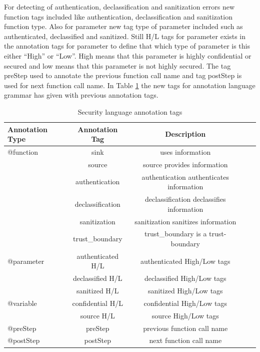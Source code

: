 For detecting of authentication, declassification and sanitization errors new function tags included like authentication, declassification and sanitization function type. Also for parameter new tag type of parameter included such as authenticated, declassified and sanitized. Still H/L tags for parameter exists in the annotation tags for parameter to define that which type of parameter is this either \enquote{High} or \enquote{Low}. High means that this parameter is highly confidential or secured and low means that this parameter is not highly secured. The tag preStep used to annotate the previous function call name and tag postStep is used for next function call name. In Table \ref{table:Security_language_annotation_tags} the new tags for annotation language grammar has given with previous annotation tags. 

\begin{table}
	\centering
\begin{tabular}{l*{3}{c}r}
	\hline
	Annotation Type   & Annotation Tag & Description  \\
	\hline

	@function         & sink  		   & uses information \\
	                  & source         & source provides information	\\
	                  & authentication & authentication authenticates information	\\
	                  & declassification& declassification declassifies information	\\
	                  & sanitization   & sanitization sanitizes information	\\
	                  & trust\_boundary& trust\_boundary is a trust-boundary\\ \hline

	@parameter        & authenticated H/L & authenticated High/Low tags    \\
					  & declassified H/L  & declassified High/Low tags    \\
				      & sanitized H/L     & sanitized High/Low tags    \\ \hline
	@variable         & confidential H/L & confidential High/Low tags\\
					  & source H/L & source High/Low tags   \\
	\hline
	
	@preStep         & preStep  & previous function call name\\ 	\hline
	@postStep        & postStep  & next function call name\\ 	\hline

	
\end{tabular}
\caption{Security language annotation tags}
\label{table:Security_language_annotation_tags}
\end{table}

